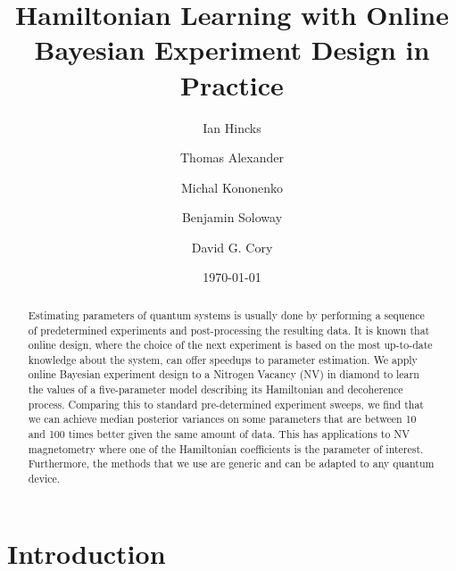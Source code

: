 \documentclass[aps,nofootinbib,twocolumn,superscriptaddress]{revtex4}
\begin{document}
\title{Hamiltonian Learning with Online Bayesian Experiment Design in Practice}

\author{Ian Hincks}
\affilUWAMath
\affilIQC

\author{Thomas Alexander}
\affilUWPhys
\affilIQC

\author{Michal Kononenko}
\affilIQC
\affilUWChemEng

\author{Benjamin Soloway}
\affilIQC
\affilHaverford

\author{David G. Cory}
\affilUWChem
\affilIQC
\affilPI
\affilCIFAR


\date{\today}

\begin{abstract}
Estimating parameters of quantum systems is usually done by performing
a sequence of predetermined experiments and post-processing the resulting data.
It is known that online design, where the
choice of the next experiment is based on
the most up-to-date knowledge about the system,
can offer speedups to parameter estimation.
We apply online Bayesian experiment design to a Nitrogen
Vacancy (NV) in diamond to learn the values of a
five-parameter model describing its Hamiltonian and decoherence process.
Comparing this to standard pre-determined experiment sweeps,
we find that we can achieve median posterior variances on some parameters
that are between 10 and 100 times better given the same amount of data.
This has applications to NV magnetometry where one of the Hamiltonian
coefficients is the parameter of interest. Furthermore, the methods that we use are generic and can be adapted to any quantum device.
\end{abstract}

\maketitle




\section{Introduction}
\label{sec:intro}
\end{document}
